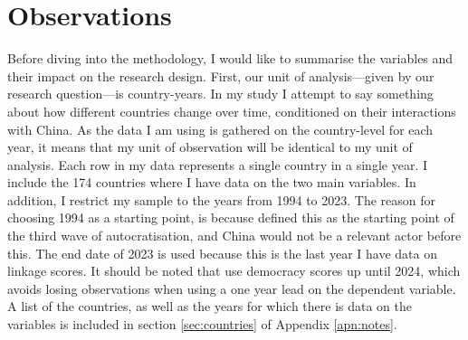 \begin{table}[H]
\centering
\caption{Components of the FBIC index}
\label{tab:fbic}
\vspace{0.5em}
\end{table}

\section{Observations}
Before diving into the methodology, I would like to summarise the variables and their impact on the research design. First, our unit of analysis---given by our research question---is country-years. In my study I attempt to say something about how different countries change over time,  conditioned on their interactions with China. As the data I am using is gathered on the country-level for each year, it means that my unit of observation will be identical to my unit of analysis. Each row in my data represents a single country in a single year. I include the 174 countries where I have data on the two main variables. In addition, I restrict my sample to the years from 1994 to 2023. The reason for choosing 1994 as a starting point, is because \citet{luhrmann_third_2019} defined this as the starting point of the third wave of autocratisation, and China would not be a relevant actor before this. The end date of 2023 is used because this is the last year I have data on linkage scores. It should be noted that use democracy scores up until 2024,  which avoids losing observations when using a one year lead on the dependent variable. A list of the countries, as well as the years for which there is data on the variables is included in section \ref{sec:countries} of Appendix \ref{apn:notes}. 

